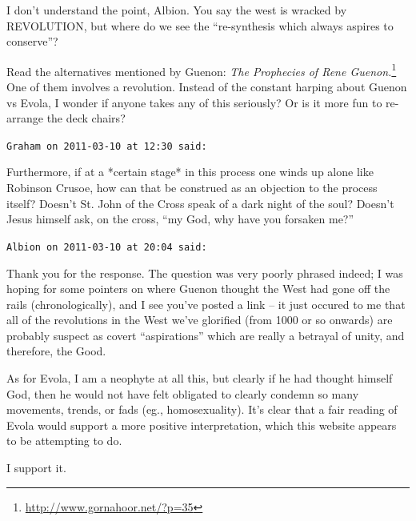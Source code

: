 \begin{footnotesize}
\begin{sffamily}
I don't understand the point, Albion. You say the west is wracked by REVOLUTION, but where do we see the ``re-synthesis which always aspires to conserve''?

Read the alternatives mentioned by Guenon:
\textit{The Prophecies of Rene Guenon.}\footnote{\url{http://www.gornahoor.net/?p=35}} One of them involves a revolution. Instead of the constant harping about Guenon vs Evola, I wonder if anyone takes any of this seriously? Or is it more fun to re-arrange the deck chairs?

\hfill

\texttt{Graham on 2011-03-10 at 12:30 said:}

Furthermore, if at a *certain stage* in this process one winds up alone like Robinson Crusoe, how can that be construed as an objection to the process itself? Doesn't St. John of the Cross speak of a dark night of the soul? Doesn't Jesus himself ask, on the cross, ``my God, why have you forsaken me?''

\hfill

\texttt{Albion on 2011-03-10 at 20:04 said:}

Thank you for the response. The question was very poorly phrased indeed; I was hoping for some pointers on where Guenon thought the West had gone off the rails (chronologically), and I see you've posted a link -- it just occured to me that all of the revolutions in the West we've glorified (from 1000 or so onwards) are probably suspect as covert ``aspirations'' which are really a betrayal of unity, and therefore, the Good.

As for Evola, I am a neophyte at all this, but clearly if he had thought himself God, then he would not have felt obligated to clearly condemn so many movements, trends, or fads (eg., homosexuality). It's clear that a fair reading of Evola would support a more positive interpretation, which this website appears to be attempting to do.

I support it.

\hfill

\end{sffamily}
\end{footnotesize}

